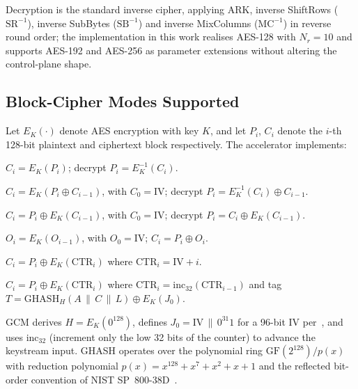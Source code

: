 \documentclass[conference,10pt,a4paper]{IEEEtran}
\begin{document}
Decryption is the standard inverse cipher, applying ARK, inverse
ShiftRows ($\mathrm{SR}^{-1}$), inverse SubBytes ($\mathrm{SB}^{-1}$) and
inverse MixColumns ($\mathrm{MC}^{-1}$) in reverse round order; the
implementation in this work realises AES-128 with $N_r = 10$ and supports
AES-192 and AES-256 as parameter extensions without altering the
control-plane shape.

\subsection{Block-Cipher Modes Supported}
Let $E_K(\cdot)$ denote AES encryption with key $K$, and let $P_i$, $C_i$
denote the $i$-th 128-bit plaintext and ciphertext block respectively.
The accelerator implements:

\begin{description}[leftmargin=4em,style=nextline]
  \item[ECB] $C_i = E_K(P_i)$;
             decrypt $P_i = E_K^{-1}(C_i)$.
  \item[CBC] $C_i = E_K(P_i \oplus C_{i-1})$, with $C_0 = \mathrm{IV}$;
             decrypt $P_i = E_K^{-1}(C_i) \oplus C_{i-1}$.
  \item[CFB] $C_i = P_i \oplus E_K(C_{i-1})$, with $C_0 = \mathrm{IV}$;
             decrypt $P_i = C_i \oplus E_K(C_{i-1})$.
  \item[OFB] $O_i = E_K(O_{i-1})$, with $O_0 = \mathrm{IV}$;
             $C_i = P_i \oplus O_i$.
  \item[CTR] $C_i = P_i \oplus E_K(\mathrm{CTR}_i)$ where
             $\mathrm{CTR}_i = \mathrm{IV} + i$.
  \item[GCM] $C_i = P_i \oplus E_K(\mathrm{CTR}_i)$ where
             $\mathrm{CTR}_i = \mathrm{inc}_{32}(\mathrm{CTR}_{i-1})$
             and tag
             $T = \mathrm{GHASH}_H(A \,\|\, C \,\|\, L)
              \oplus E_K(J_0)$.
\end{description}

GCM derives $H = E_K(0^{128})$, defines $J_0 = \mathrm{IV} \,\|\, 0^{31} 1$
for a 96-bit IV per~\cite[\S7.1]{sp80038d}, and uses inc$_{32}$
(increment only the low 32 bits of the counter) to advance the keystream
input.  GHASH operates over the polynomial ring
$\mathrm{GF}(2^{128})/p(x)$ with reduction polynomial
$p(x) = x^{128} + x^7 + x^2 + x + 1$ and the reflected bit-order
convention of NIST SP~800-38D~\cite{sp80038d}.
\end{document}
